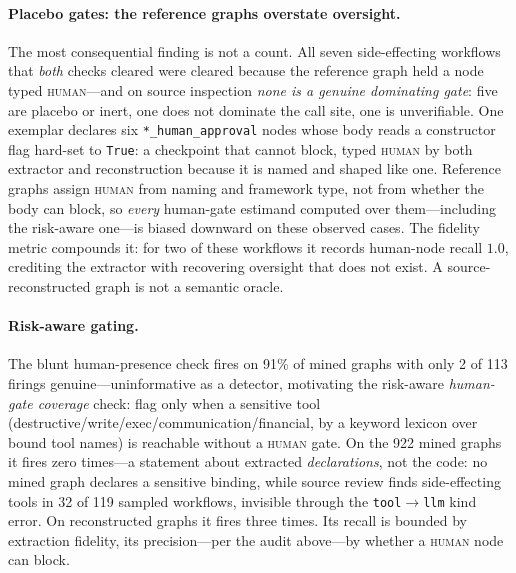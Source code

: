 \paragraph{Placebo gates: the reference graphs overstate oversight.}
The most consequential finding is not a count. All seven side-effecting
workflows that \emph{both} checks cleared were cleared because the reference
graph held a node typed \textsc{human}---and on source inspection \emph{none is
a genuine dominating gate}: five are placebo or inert, one does not dominate the
call site, one is unverifiable. One exemplar declares six
\texttt{*\_human\_approval} nodes whose body reads a constructor flag hard-set
to \texttt{True}: a checkpoint that cannot block, typed \textsc{human} by both
extractor and reconstruction because it is named and shaped like one. Reference
graphs assign \textsc{human} from naming and framework type, not from whether the
body can block, so \emph{every} human-gate estimand computed over
them---including the risk-aware one---is biased downward on these observed cases.
The fidelity metric compounds it: for two of these workflows it records
human-node recall $1.0$, crediting the extractor with recovering oversight that
does not exist. A source-reconstructed graph is not a semantic oracle.

\paragraph{Risk-aware gating.}
The blunt human-presence check fires on 91\% of mined graphs with only 2 of 113
firings genuine---uninformative as a detector, motivating the risk-aware
\emph{human-gate coverage} check: flag only when a sensitive tool
(destructive/write/exec/communication/financial, by a keyword lexicon over bound
tool names) is reachable without a \textsc{human} gate. On the 922 mined graphs
it fires zero times---a statement about extracted \emph{declarations}, not the
code: no mined graph declares a sensitive binding, while source review finds
side-effecting tools in 32 of 119 sampled workflows, invisible through the
\texttt{tool}$\rightarrow$\texttt{llm} kind error. On reconstructed graphs it
fires three times. Its recall is bounded by extraction fidelity, its
precision---per the audit above---by whether a \textsc{human} node can block.


